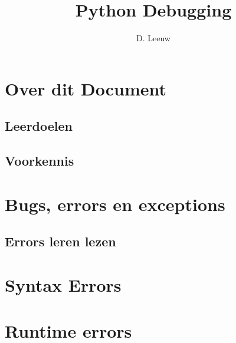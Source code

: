 \documentclass[a4paper,12pt,twoside,openright,titlepage]{article}
\author{D. Leeuw}
\title{Python Debugging}
\date{\today\\
1.1.1\\
\vfill
\raggedright
\copyright\ 2025-2026 Dennis Leeuw\\
}
\begin{document}

\maketitle


\section{Over dit Document}
\subsection{Leerdoelen}

\subsection{Voorkennis}




\section{Bugs, errors en exceptions}

\subsection{Errors leren lezen}


\section{Syntax Errors}


\section{Runtime errors}


\printindex
\end{document}

